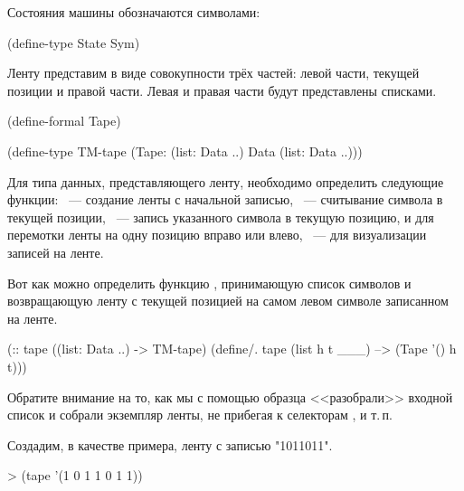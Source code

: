 Состояния машины обозначаются символами:
\begin{SchemeCode}
(define-type State  Sym)
\end{SchemeCode}

Ленту представим в виде совокупности трёх частей: левой части, текущей позиции и правой части. Левая и правая части будут представлены списками. 

\begin{SchemeCode}
(define-formal Tape)

(define-type TM-tape
  (Tape: (list: Data ..) Data (list: Data ..)))
\end{SchemeCode}

Для типа данных, представляющего ленту, необходимо определить следующие функции: ~--- создание ленты с начальной записью, ~--- считывание символа в текущей позиции, ~--- запись указанного символа в текущую позицию,  и  для перемотки ленты на одну позицию вправо или влево, ~--- для визуализации записей на ленте.


Вот как можно определить функцию , принимающую список символов и возвращающую ленту с текущей позицией на самом левом символе записанном на ленте.
\begin{Definition}[emph={h,t}]
(:: tape ((list: Data ..) -> TM-tape)
  (define/. tape
    (list h t ___) --> (Tape '() h t)))
\end{Definition}
Обратите внимание на то, как мы с помощью образца <<разобрали>> входной список и собрали экземпляр ленты, не прибегая к селекторам ,  и т.\,п.

\begin{example}{Создадим, в качестве примера, ленту с записью "1011011".}
\begin{ExampleCode}
> (tape '(1 0 1 1 0 1 1))
\end{ExampleCode}
\end{example}

